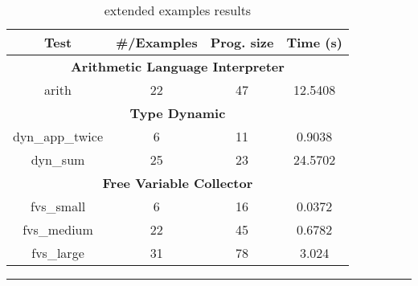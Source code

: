 \begin{table}
  \begin{center}
    \tabcolsep 5.8pt
    \footnotesize
    \begin{tabular}{cccc}
      \hline
      \textbf{Test} & \textbf{ \#/Examples } & \textbf{ Prog. size } & \textbf{Time (s)} \\
      \hline
      \multicolumn{4}{c}{\textbf{Arithmetic Language Interpreter}} \\
      arith & 22 & 47 & 12.5408 \\
      \multicolumn{4}{c}{\textbf{Type Dynamic}} \\
      dyn\_app\_twice & 6 & 11 & 0.9038 \\
      dyn\_sum & 25 & 23 & 24.5702 \\
      \multicolumn{4}{c}{\textbf{Free Variable Collector}} \\
      fvs\_small & 6 & 16 & 0.0372 \\
      fvs\_medium & 22 & 45 & 0.6782 \\
      fvs\_large & 31 & 78 & 3.024 \\
      \hline
    \end{tabular}
  \end{center}

  \hrule
  \caption{\myth{} extended examples results}
  \label{fig:myth-extended-examples-results}
\end{table}
